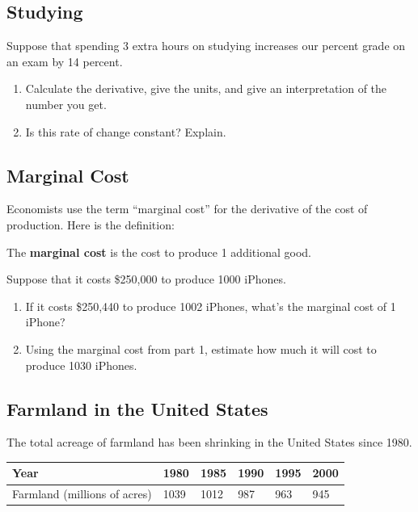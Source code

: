 \documentclass[
]{book}
\providecommand{\tightlist}{%
  \setlength{\itemsep}{0pt}\setlength{\parskip}{0pt}}
\begin{document}
\hypertarget{studying}{%
\subsection{Studying}\label{studying}}

Suppose that spending 3 extra hours on studying increases our percent grade on an exam by 14 percent.

\begin{enumerate}
\def\labelenumi{\arabic{enumi}.}
\tightlist
\item
  Calculate the derivative, give the units, and give an interpretation of the number you get.
\item
  Is this rate of change constant? Explain.
\end{enumerate}

\hypertarget{marginal-cost}{%
\subsection{Marginal Cost}\label{marginal-cost}}

Economists use the term ``marginal cost'' for the derivative of the cost of production. Here is the definition:

\bigskip

The \textbf{marginal cost} is the cost to produce 1 additional good.

\bigskip

Suppose that it costs \$250,000 to produce 1000 iPhones.

\begin{enumerate}
\def\labelenumi{\arabic{enumi}.}
\tightlist
\item
  If it costs \$250,440 to produce 1002 iPhones, what's the marginal cost of 1 iPhone?
\item
  Using the marginal cost from part 1, estimate how much it will cost to produce 1030 iPhones.
\end{enumerate}

\hypertarget{farmland-in-the-united-states}{%
\subsection{Farmland in the United States}\label{farmland-in-the-united-states}}

The total acreage of farmland has been shrinking in the United States since 1980.

\begin{longtable}[]{@{}llllll@{}}
\toprule
Year & 1980 & 1985 & 1990 & 1995 & 2000\tabularnewline
\midrule
\endhead
Farmland (millions of acres) & 1039 & 1012 & 987 & 963 & 945\tabularnewline
\bottomrule
\end{longtable}
\end{document}
